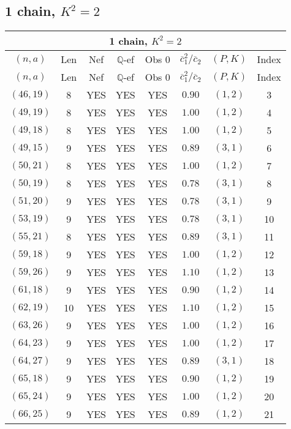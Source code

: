\subsection{1 chain, $K^2 = 2$}
\begin{longtable}{|c|c|c|c|c|c|c|c|}
\hline
\multicolumn{8}{|c|}{1 chain, $K^2 = 2$}\\
\hline
$(n,a)$ & Len & Nef & $\mathbb Q$-ef & Obs 0 & $\overline c_1^2 / \overline c_2$ & $(P,K)$ & Index\\
\hline
\endfirsthead

\hline
$(n,a)$ & Len & Nef & $\mathbb Q$-ef & Obs 0 & $\overline c_1^2 / \overline c_2$ & $(P,K)$ & Index\\
\hline
\endhead
\hline
\endfoot

$(46,19)$ & 8 & YES & YES & YES & $0.90$ & $(1,2)$ & 3\\
$(49,19)$ & 8 & YES & YES & YES & $1.00$ & $(1,2)$ & 4\\
$(49,18)$ & 8 & YES & YES & YES & $1.00$ & $(1,2)$ & 5\\
$(49,15)$ & 9 & YES & YES & YES & $0.89$ & $(3,1)$ & 6\\
$(50,21)$ & 8 & YES & YES & YES & $1.00$ & $(1,2)$ & 7\\
$(50,19)$ & 8 & YES & YES & YES & $0.78$ & $(3,1)$ & 8\\
$(51,20)$ & 9 & YES & YES & YES & $0.78$ & $(3,1)$ & 9\\
$(53,19)$ & 9 & YES & YES & YES & $0.78$ & $(3,1)$ & 10\\
$(55,21)$ & 8 & YES & YES & YES & $0.89$ & $(3,1)$ & 11\\
$(59,18)$ & 9 & YES & YES & YES & $1.00$ & $(1,2)$ & 12\\
$(59,26)$ & 9 & YES & YES & YES & $1.10$ & $(1,2)$ & 13\\
$(61,18)$ & 9 & YES & YES & YES & $0.90$ & $(1,2)$ & 14\\
$(62,19)$ & 10 & YES & YES & YES & $1.10$ & $(1,2)$ & 15\\
$(63,26)$ & 9 & YES & YES & YES & $1.00$ & $(1,2)$ & 16\\
$(64,23)$ & 9 & YES & YES & YES & $1.00$ & $(1,2)$ & 17\\
$(64,27)$ & 9 & YES & YES & YES & $0.89$ & $(3,1)$ & 18\\
$(65,18)$ & 9 & YES & YES & YES & $0.90$ & $(1,2)$ & 19\\
$(65,24)$ & 9 & YES & YES & YES & $1.00$ & $(1,2)$ & 20\\
$(66,25)$ & 9 & YES & YES & YES & $0.89$ & $(1,2)$ & 21\\

\end{longtable}
